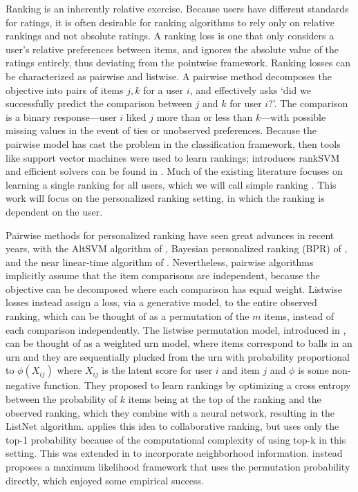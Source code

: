 \documentclass{article}
\begin{document}
Ranking is an inherently relative exercise.
Because users have different standards for ratings, it is often desirable for ranking algorithms to rely only on relative rankings and not absolute ratings.
A ranking loss is one that only considers a user's relative preferences between items, and ignores the absolute value of the ratings entirely, thus deviating from the pointwise framework.
Ranking losses can be characterized as pairwise and listwise.
A pairwise method decomposes the objective into pairs of items $j,k$ for a user $i$, and effectively asks `did we successfully predict the comparison between $j$ and $k$ for user $i$?'.
The comparison is a binary response---user $i$ liked $j$ more than or less than $k$---with possible missing values in the event of ties or unobserved preferences.
Because the pairwise model has cast the problem in the classification framework, then tools like support vector machines were used to learn rankings; \cite{joachims2002optimizing} introduces rankSVM and efficient solvers can be found in \cite{chapelle2010efficient}.
Much of the existing literature focuses on learning a single ranking for all users, which we will call simple ranking \cite{freund2003efficient,agarwal2006ranking, pahikkala2009efficient}.
This work will focus on the personalized ranking setting, in which the ranking is dependent on the user.

Pairwise methods for personalized ranking have seen great advances in recent years, with the AltSVM algorithm of \cite{park2015preference}, Bayesian personalized ranking (BPR) of \cite{rendle2009bpr}, and the near linear-time algorithm of \cite{wu2017large}.
Nevertheless, pairwise algorithms implicitly assume that the item comparisons are independent, because the objective can be decomposed where each comparison has equal weight.
Listwise losses instead assign a loss, via a generative model, to the entire observed ranking, which can be thought of as a permutation of the $m$ items, instead of each comparison independently.
The listwise permutation model, introduced in \cite{cao2007learning}, can be thought of as a weighted urn model, where items correspond to balls in an urn and they are sequentially plucked from the urn with probability proportional to $\phi(X_{ij})$ where $X_{ij}$ is the latent score for user $i$ and item $j$ and $\phi$ is some non-negative function.
They proposed to learn rankings by optimizing a cross entropy between the probability of $k$ items being at the top of the ranking and the observed ranking, which they combine with a neural network, resulting in the ListNet algorithm. 
\cite{shi2010list} applies this idea to collaborative ranking, but uses only the top-1 probability because of the computational complexity of using top-k in this setting.  
This was extended in \cite{huang2015listwise} to incorporate neighborhood information.
\cite{xia2008listwise} instead proposes a maximum likelihood framework that uses the permutation probability directly, which enjoyed some empirical success.
\end{document}
